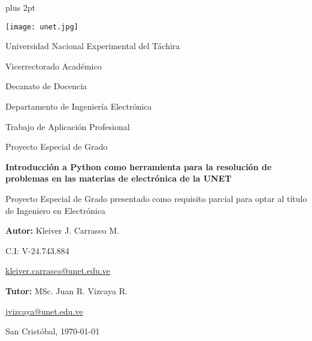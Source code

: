 \begin{titlepage}
	\parskip=7.25pt plus 2pt
	\setcounter{page}{2}
	\begin{center}
		\texttt{[image: unet.jpg]}
		
		Universidad Nacional Experimental del Táchira 
		
		Vicerrectorado Académico
		
		Decanato de Docencia
		
		Departamento de Ingeniería Electrónica
		
		Trabajo de Aplicación Profesional
		
		Proyecto Especial de Grado
	\end{center}

	\centering
	\vspace{2cm}
	\vfill
	{\Large \textbf{Introducción a Python como herramienta para la resolución de problemas en las materias de electrónica de la UNET}\par}
	\vspace{10pt}
	{\large Proyecto Especial de Grado presentado como requisito parcial para optar al título de Ingeniero en Electrónica}

	\vfill
	\begin{flushright}
		\begin{spacing}{1.5}
			\textbf{Autor:} Kleiver J. Carrasco M.
			
			C.I: V-24.743.884
			
			\href{kleiver.carrasco@unet.edu.ve}{kleiver.carrasco@unet.edu.ve}
			
			\textbf{Tutor:} MSc. Juan R. Vizcaya R.
			
			\href{jvizcaya@unet.edu.ve}{jvizcaya@unet.edu.ve}
		\end{spacing}	
	\end{flushright}

	\vfill
		San Cristóbal, \monthyeardate\today
	\leavevmode
\end{titlepage}